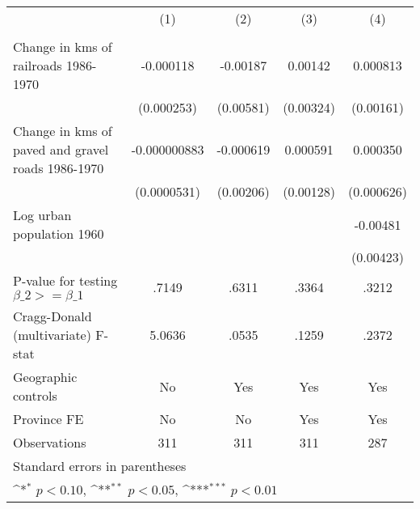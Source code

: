 {
\def\sym#1{\ifmmode^{#1}\else\(^{#1}\)\fi}
\begin{tabular}{l*{4}{c}}
\hline\hline
                &\multicolumn{1}{c}{(1)}&\multicolumn{1}{c}{(2)}&\multicolumn{1}{c}{(3)}&\multicolumn{1}{c}{(4)}\\
                &\multicolumn{1}{c}{}&\multicolumn{1}{c}{}&\multicolumn{1}{c}{}&\multicolumn{1}{c}{}\\
\hline
Change in kms of railroads 1986-1970&-0.000118         & -0.00187         &  0.00142         & 0.000813         \\
                &(0.000253)         &(0.00581)         &(0.00324)         &(0.00161)         \\
[1em]
Change in kms of paved and gravel roads 1986-1970&-0.000000883         &-0.000619         & 0.000591         & 0.000350         \\
                &(0.0000531)         &(0.00206)         &(0.00128)         &(0.000626)         \\
[1em]
Log urban population 1960&                  &                  &                  & -0.00481         \\
                &                  &                  &                  &(0.00423)         \\
\hline
P-value for testing $\beta\_{2} >= \beta\_{1}$&    .7149         &    .6311         &    .3364         &    .3212         \\
Cragg-Donald (multivariate) F-stat&   5.0636         &    .0535         &    .1259         &    .2372         \\
Geographic controls&       No         &      Yes         &      Yes         &      Yes         \\
Province FE     &       No         &       No         &      Yes         &      Yes         \\
Observations    &      311         &      311         &      311         &      287         \\
\hline\hline
\multicolumn{5}{l}{\footnotesize Standard errors in parentheses}\\
\multicolumn{5}{l}{\footnotesize \sym{*} \(p<0.10\), \sym{**} \(p<0.05\), \sym{***} \(p<0.01\)}\\
\end{tabular}
}

